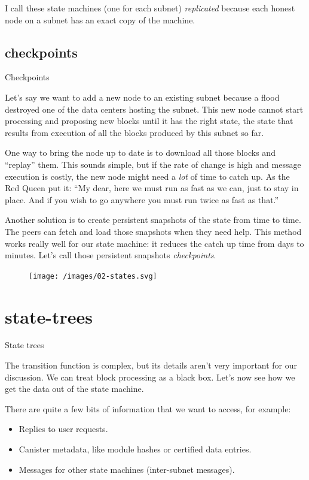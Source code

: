 \documentclass{article}
\begin{document}
I call these state machines (one for each subnet) \emph{replicated} because each honest node on a subnet has an exact copy of the machine.

\subsection{checkpoints}{Checkpoints}

Let's say we want to add a new node to an existing subnet because a flood destroyed one of the data centers hosting the subnet.
This new node cannot start processing and proposing new blocks until it has the right state, the state that results from execution of all the blocks produced by this subnet so far.

One way to bring the node up to date is to download all those blocks and ``replay'' them.
This sounds simple, but if the rate of change is high and message execution is costly, the new node might need a \emph{lot} of time to catch up.
As the Red Queen put it: ``My dear, here we must run as fast as we can, just to stay in place.
And if you wish to go anywhere you must run twice as fast as that.''

Another solution is to create persistent snapshots of the state from time to time.
The peers can fetch and load those snapshots when they need help.
This method works really well for our state machine: it reduces the catch up time from days to minutes.
Let's call those persistent snapshots \emph{checkpoints}.

\begin{figure}[grayscale-diagram]
\texttt{[image: /images/02-states.svg]}
\end{figure}

\section{state-trees}{State trees}

The transition function is complex, but its details aren't very important for our discussion.
We can treat block processing as a black box.
Let's now see how we get the data out of the state machine.

There are quite a few bits of information that we want to access, for example:
\begin{itemize}
\item Replies to user requests.
\item Canister metadata, like module hashes or certified data entries.
\item Messages for other state machines (inter-subnet messages).
\end{itemize}
\end{document}
